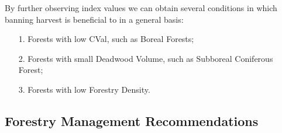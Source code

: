 \documentclass{mcmthesis}
\numberwithin{figure}{section}
\numberwithin{table}{section}
\numberwithin{equation}{section}
\begin{document}
By further observing index values we can obtain several conditions in which banning
harvest is beneficial to in a general basis:
\begin{enumerate}
  \item [1.] Forests with low CVal, such as Boreal Forests;
  \item [2.] Forests with small Deadwood Volume, such as Subboreal Coniferous Forest;
  \item [3.] Forests with low Forestry Density.
\end{enumerate}


\subsection{Forestry Management Recommendations}
\end{document}
